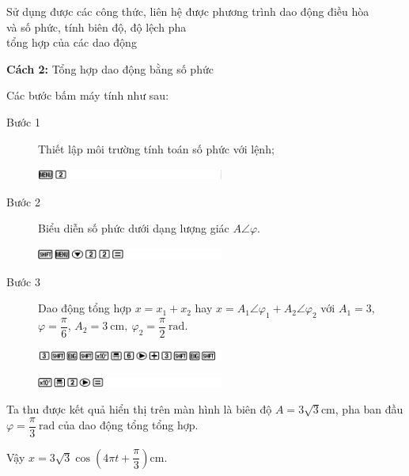 \begin{dang}{Sử dụng được các công thức, liên hệ được phương trình dao động điều hòa\\ và số phức, tính biên độ, độ lệch pha\\ tổng hợp của các dao động}
{		\textbf{Cách 2: }Tổng hợp dao động bằng số phức
		
		Các bước bấm máy tính như sau:
		\begin{description} 
			\item[Bước 1] Thiết lập môi trường tính toán số phức với lệnh;
			\begin{center}
				\includegraphics[width=0.5\textwidth]{../figs/VN12-PH-06-A-004-1-V2-6.jpg}
			\end{center}
			
			\item[Bước 2] Biểu diễn số phức dưới dạng lượng giác $A\angle \varphi$. 
			\begin{center}
				\includegraphics[width=0.5\textwidth]{../figs/VN12-PH-06-A-004-1-V2-7.jpg}
			\end{center}
			
			\item[Bước 3] Dao động tổng hợp $x=x_1+x_2$ hay $x=A_1\angle \varphi_1+A_2\angle \varphi_2$ với $A_1=3$, $\varphi =\dfrac{\pi}{6}$, $A_2=3\ \text{cm}, \ \varphi_2=\dfrac{\pi}{2}\ \text{rad}$.
			
			\begin{center}
				\includegraphics[width=0.5\textwidth]{../figs/VN12-PH-06-A-004-1-V2-8.jpg}
			\end{center}
			
			\begin{center}
				\includegraphics[width=0.5\textwidth]{../figs/VN12-PH-06-A-004-1-V2-9.jpg}
			\end{center}
		\end{description} 
		
		Ta thu được kết quả hiển thị trên màn hình là biên độ  $A=3\sqrt{3}\text{cm}$, pha ban đầu $\varphi=\dfrac{\pi}{3}\ \text{rad}$ của dao động tổng tổng hợp.
		
		Vậy $x=3\sqrt{3}\cos\left(4\pi t+\dfrac{\pi}{3}\right) \textrm{cm}$.
		
}
\end{dang}
